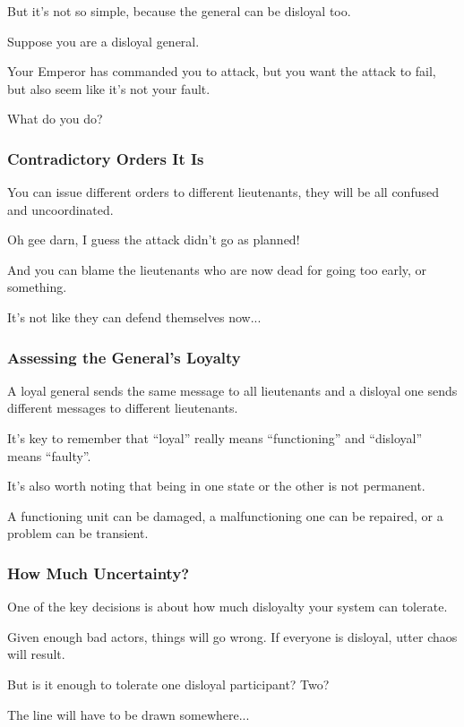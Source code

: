 \begin{frame}
\frametitle{}

But it's not so simple, because the general can be disloyal too. 

Suppose you are a disloyal general. 

Your Emperor has commanded you to attack, but you want the attack to fail, but also seem like it's not your fault. 

What do you do?

\end{frame}

\begin{frame}
\frametitle{Contradictory Orders It Is}

You can issue different orders to different lieutenants, they will be all confused and uncoordinated. 

Oh gee darn, I guess the attack didn't go as planned! 

And you can blame the lieutenants who are now dead for going too early, or something.

It's not like they can defend themselves now... 

\end{frame}

\begin{frame}
\frametitle{Assessing the General's Loyalty}

A loyal general sends the same message to all lieutenants and a disloyal one sends different messages to different lieutenants. 

It's key to remember that ``loyal'' really means ``functioning'' and ``disloyal'' means ``faulty''.

It's also worth noting that being in one state or the other is not permanent. 

A functioning unit can be damaged, a malfunctioning one can be repaired, or a problem can be transient.

\end{frame}

\begin{frame}
\frametitle{How Much Uncertainty?}

One of the key decisions is about how much disloyalty your system can tolerate. 

Given enough bad actors, things will go wrong. If everyone is disloyal, utter chaos will result. 

But is it enough to tolerate one disloyal participant? Two? 

The line will have to be drawn somewhere...

\end{frame}

